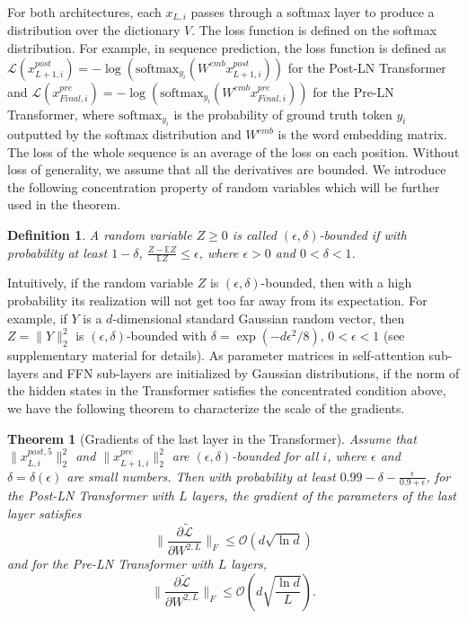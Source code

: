 \documentclass{article}
\newtheorem{theorem}{Theorem}
\newtheorem{definition}{Definition}
\begin{document}
For both architectures, each $x_{L,i}$  passes through a softmax layer to produce a distribution over the dictionary $V$. The loss function is defined on the softmax distribution. For example, in sequence prediction, the loss function is defined as $\mathcal{L}(x_{L+1,i}^{post})=-\log(\text{softmax}_{y_i}(W^{emb}x_{L+1,i}^{post}))$ for the Post-LN Transformer and $\mathcal{L}(x_{Final,i}^{pre})=-\log(\text{softmax}_{y_i}(W^{emb}x_{Final,i}^{pre}))$ for the Pre-LN Transformer, where $\text{softmax}_{y_i}$ is the probability of ground truth token $y_i$ outputted by the softmax distribution and $W^{emb}$ is the word embedding matrix. The loss of the whole sequence is an average of the loss on each position. Without loss of generality, we assume that all the derivatives are bounded. We introduce the following concentration property of random variables which will be further used in the theorem.

\begin{definition}
A random variable $Z\geq 0$ is called $(\epsilon,\delta)$-bounded if with probability at least $1-\delta$, $\frac{Z-\mathbb{E}Z}{\mathbb{E}Z}\leq \epsilon$, where $\epsilon>0$ and $0<\delta<1$. 
\end{definition}

Intuitively, if the random variable $Z$ is $(\epsilon,\delta)$-bounded, then with a high probability its realization will not get too far away from its expectation. For example, if $Y$ is a $d$-dimensional standard Gaussian random vector, then $Z=\|Y\|_2^2$ is $(\epsilon,\delta)$-bounded with $\delta=\exp(-d\epsilon^2/8)$, $0<\epsilon<1$ (see 
 supplementary material for details). As parameter matrices in self-attention sub-layers and FFN sub-layers are initialized by Gaussian distributions, if the norm of the hidden states in the Transformer satisfies the concentrated condition above, we have the following theorem to characterize the scale of the gradients.

\begin{theorem} [Gradients of the last layer in the Transformer]
Assume that $\|x^{post,5}_{L,i}\|_2^2$ and $\|x^{pre}_{L+1,i}\|_2^2$ are $(\epsilon,\delta)$-bounded for all $i$, where $\epsilon$ and $\delta=\delta(\epsilon)$ are small numbers.  Then with probability at least $0.99-\delta-\frac{\epsilon}{0.9+\epsilon}$, for the Post-LN Transformer with $L$ layers, the gradient of the parameters of the last layer satisfies $$\|\frac{\partial \tilde{\mathcal{L}}}{\partial W^{2,L}}\|_F\leq \mathcal{O}(d\sqrt{\ln{d}})$$ and for the Pre-LN Transformer with $L$ layers, $$\|\frac{\partial \tilde{\mathcal{L}}}{\partial W^{2,L}}\|_F\leq \mathcal{O}\left(d\sqrt{\frac{\ln{d}}{L}}\right).$$
\end{theorem}
\end{document}

